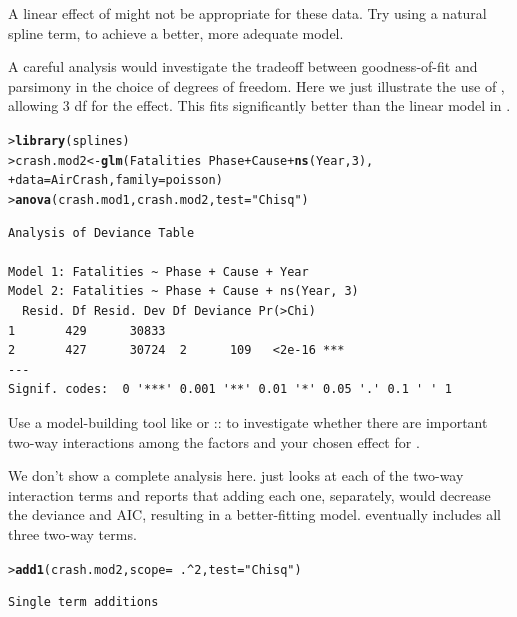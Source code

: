 \documentclass[10pt]{report}\usepackage[]{graphicx}\usepackage[]{color}
\makeatletter
\newcommand{\hlnum}[1]{\textcolor[rgb]{0.686,0.059,0.569}{#1}}%
\newcommand{\hlstr}[1]{\textcolor[rgb]{0.192,0.494,0.8}{#1}}%
\newcommand{\hlopt}[1]{\textcolor[rgb]{0,0,0}{#1}}%
\newcommand{\hlstd}[1]{\textcolor[rgb]{0.345,0.345,0.345}{#1}}%
\newcommand{\hlkwb}[1]{\textcolor[rgb]{0.69,0.353,0.396}{#1}}%
\newcommand{\hlkwc}[1]{\textcolor[rgb]{0.333,0.667,0.333}{#1}}%
\newcommand{\hlkwd}[1]{\textcolor[rgb]{0.737,0.353,0.396}{\textbf{#1}}}%
\newenvironment{kframe}{%
 \def\at@end@of@kframe{}%
 \ifinner\ifhmode%
  \def\at@end@of@kframe{\end{minipage}}%
  \begin{minipage}{\columnwidth}%
 \fi\fi%
 \def\FrameCommand##1{\hskip\@totalleftmargin \hskip-\fboxsep
 \colorbox{shadecolor}{##1}\hskip-\fboxsep
     \hskip-\linewidth \hskip-\@totalleftmargin \hskip\columnwidth}%
 \MakeFramed {\advance\hsize-\width
   \@totalleftmargin\z@ \linewidth\hsize
   \@setminipage}}%
 {\par\unskip\endMakeFramed%
 \at@end@of@kframe}
\newenvironment{knitrout}{}{} %
\renewenvironment{knitrout}{\small\renewcommand{\baselinestretch}{.85}}{} %
\makeatother
\begin{document}
\begin{Exercises}
\begin{enumerate*}
    \item A linear effect of  might not be appropriate for these data.  Try using a natural spline term,
     to achieve a better, more adequate model.
    \begin{ans}
    A careful analysis would investigate the tradeoff between goodness-of-fit and parsimony in the choice
    of degrees of freedom.  Here we just illustrate the use of , allowing 3 df for the
     effect.  This fits significantly better than the linear model in .
\begin{knitrout}\footnotesize
{}\color{fgcolor}\begin{kframe}
\begin{alltt}
\hlstd{> }\hlkwd{library}\hlstd{(splines)}
\hlstd{> }\hlstd{crash.mod2} \hlkwb{<-} \hlkwd{glm}\hlstd{(Fatalities} \hlopt{~} \hlstd{Phase} \hlopt{+} \hlstd{Cause} \hlopt{+} \hlkwd{ns}\hlstd{(Year,}\hlnum{3}\hlstd{),}
\hlstd{+ }                 \hlkwc{data}\hlstd{=AirCrash,} \hlkwc{family}\hlstd{=poisson)}
\hlstd{> }\hlkwd{anova}\hlstd{(crash.mod1, crash.mod2,} \hlkwc{test}\hlstd{=}\hlstr{"Chisq"}\hlstd{)}
\end{alltt}
\begin{verbatim}
Analysis of Deviance Table

Model 1: Fatalities ~ Phase + Cause + Year
Model 2: Fatalities ~ Phase + Cause + ns(Year, 3)
  Resid. Df Resid. Dev Df Deviance Pr(>Chi)    
1       429      30833                         
2       427      30724  2      109   <2e-16 ***
---
Signif. codes:  0 '***' 0.001 '**' 0.01 '*' 0.05 '.' 0.1 ' ' 1
\end{verbatim}
\end{kframe}
\end{knitrout}

    \end{ans}
    
    \item Use a model-building tool like  or :: to investigate whether there
    are important two-way interactions among the factors and your chosen effect for .
    \begin{ans}
    We don't show a complete analysis here.  just looks at each of the two-way interaction terms
    and reports that adding each one, separately, would decrease the deviance and AIC, resulting in a better-fitting
    model.   eventually includes all three two-way terms.
\begin{knitrout}\footnotesize
{}\color{fgcolor}\begin{kframe}
\begin{alltt}
\hlstd{> }\hlkwd{add1}\hlstd{(crash.mod2,} \hlkwc{scope}\hlstd{=} \hlopt{~}\hlstd{.}\hlopt{^}\hlnum{2}\hlstd{,} \hlkwc{test}\hlstd{=}\hlstr{"Chisq"}\hlstd{)}
\end{alltt}
\begin{verbatim}
Single term additions


\end{verbatim}
\end{kframe}
\end{knitrout}
\end{ans}
\end{enumerate*}
\end{Exercises}
\end{document}
